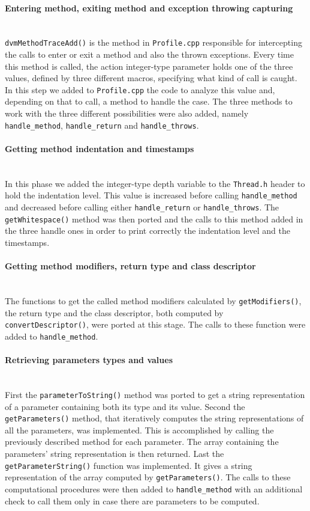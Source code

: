 \paragraph{Entering method, exiting method and exception throwing capturing} ~\\
\texttt{dvmMethodTraceAdd()} is the method in \texttt{Profile.cpp}
responsible for intercepting the calls to enter or exit a method and
also the thrown exceptions. Every time this method is called, the
action integer-type parameter holds one of the three values, defined
by three different macros, specifying what kind of call is caught. In
this step we added to \texttt{Profile.cpp} the code to analyze this
value and, depending on that to call, a method to handle the case. The
three methods to work with the three different possibilities were also
added, namely \texttt{handle\_method}, \texttt{handle\_return} and
\texttt{handle\_throws}.

\paragraph{Getting method indentation and timestamps} ~\\
In this phase we added the integer-type depth variable to the
\texttt{Thread.h} header to hold the indentation level. This value is
increased before calling \texttt{handle\_method} and decreased before
calling either \texttt{handle\_return} or \texttt{handle\_throws}. The
\texttt{getWhitespace()} method was then ported and the calls to this
method added in the three handle ones in order to print correctly the
indentation level and the timestamps.

\paragraph{Getting method modifiers, return type and class descriptor} ~\\
The functions to get the called method modifiers calculated by
\texttt{getModifiers()}, the return type and the class descriptor,
both computed by \texttt{convertDescriptor()}, were ported at this
stage. The calls to these function were added to
\texttt{handle\_method}.

\paragraph{Retrieving parameters types and values} ~\\
First the \texttt{parameterToString()} method was ported to get a
string representation of a parameter containing both its type and its
value. Second the \texttt{getParameters()} method, that iteratively
computes the string representations of all the parameters, was implemented. This
is accomplished by calling the previously described method for each
parameter. The array containing the parameters' string representation
is then returned. Last the \texttt{getParameterString()} function was
implemented. It gives a string representation of the array computed by
\texttt{getParameters()}. The calls to these computational procedures
were then added to \texttt{handle\_method} with an additional check to
call them only in case there are parameters to be computed.

